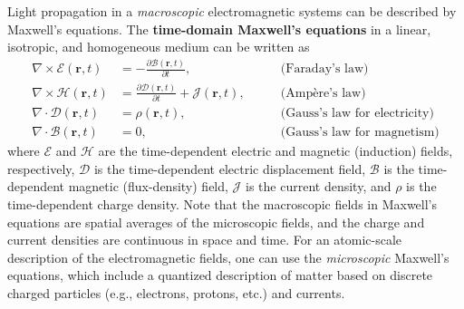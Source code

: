 Light propagation in a \emph{macroscopic} electromagnetic systems can be
described by Maxwell's equations. The \textbf{time-domain Maxwell's
equations} in a linear, isotropic, and homogeneous medium can be written as
\begin{align}
    \nabla \times \bm{\mathcal{E}} (\mathbf{r},t)            & = - \frac{\partial
    \bm{\mathcal{B}}(\mathbf{r},t)}{\partial t}, \quad \quad & \text{(Faraday's
    law)} \label{eq:faraday}                                                                                         \\
    \nabla \times \bm{\mathcal{H}} (\mathbf{r},t)            & = \frac{\partial
        \bm{\mathcal{D}}(\mathbf{r},t)}{\partial t} + \bm{\mathcal{J}}(\mathbf{r},t),
    \quad \quad                                              & \text{(Ampère's law)} \label{eq:ampere}               \\
    \nabla \cdot \bm{\mathcal{D}} (\mathbf{r},t)             & =
    \mathcal{\rho}(\mathbf{r},t), \quad \quad                & \text{(Gauss's law for electricity)}
    \label{eq:gauss_E}                                                                                               \\
    \nabla \cdot \bm{\mathcal{B}} (\mathbf{r},t)             & = 0, \quad \quad
                                                             & \text{(Gauss's law for magnetism)} \label{eq:Gauss_B}
\end{align}
where $\bm{\mathcal{E}}$ and $\bm{\mathcal{H}}$ are the time-dependent electric
and magnetic (induction) fields, respectively,
$\bm{\mathcal{D}}$ is the time-dependent electric displacement field,
$\bm{\mathcal{B}}$ is the time-dependent magnetic (flux-density) field,
$\bm{\mathcal{J}}$ is the current density,
and $\mathcal{\rho}$ is the time-dependent charge density. %
Note that the macroscopic fields in Maxwell's equations
are spatial averages of the
microscopic fields, and the charge and current densities are continuous in space
and time.
For an atomic-scale description of the electromagnetic fields, one can use the
\emph{microscopic}
Maxwell's equations, which include a quantized description of matter based on
discrete charged particles
(e.g., electrons, protons, etc.) and currents.

